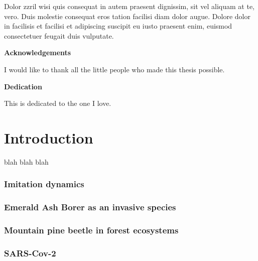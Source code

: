Dolor zzril wisi quis consequat in autem praesent dignissim, sit vel aliquam at te, vero. Duis molestie consequat eros tation facilisi diam dolor augue. Dolore dolor in facilisis et facilisi et adipiscing suscipit eu iusto praesent enim, euismod consectetuer feugait duis vulputate.

\cleardoublepage


\begin{center}\textbf{Acknowledgements}\end{center}

I would like to thank all the little people who made this thesis possible.
\cleardoublepage


\begin{center}\textbf{Dedication}\end{center}

This is dedicated to the one I love.
\cleardoublepage

\renewcommand\contentsname{Table of Contents}
\tableofcontents
\cleardoublepage
{}    %

\listoffigures
\cleardoublepage
{}		%

\listoftables
\cleardoublepage
{}		%


\chapter*{Introduction}




blah blah blah

\subsection{Imitation dynamics}

\subsection{Emerald Ash Borer as an invasive species}


\subsection{Mountain pine beetle in forest ecosystems}

\subsection{SARS-Cov-2}
